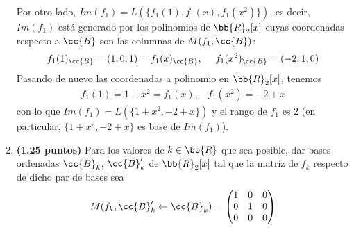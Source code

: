 \documentclass[12pt]{article}
\begin{document}
\begin{ejercicio}[2.5 puntos]
\begin{enumerate}
            Por otro lado, $Im(f_1) = L(\{f_1(1), f_1(x), f_1(x^2)\})$, es decir, $Im(f_1)$ está generado por los polinomios de $\bb{R}_2[x]$ cuyas coordenadas respecto a $\cc{B}$ son las columnas de $M(f_1, \cc{B})$:
            \begin{gather} \label{eq_2}
                f_1(1)_{\cc{B}} = (1,0,1) = f_1(x)_{\cc{B}}, \ \ \ \  f_1(x^2)_{\cc{B}} = (-2,1,0)
            \end{gather}
            Pasando de nuevo las coordenadas a polinomio en $\bb{R}_2[x]$, tenemos
            \begin{gather} \label{eq_3}
                f_1(1) = 1+x^2 = f_1(x), \ \ \ \  f_1(x^2) = -2+x
            \end{gather} 
            con lo que $Im(f_1) = L(\{1+x^2, -2+x\})$ y el rango de $f_1$ es $2$ (en particular, $\{1+x^2, -2+x\}$ es base de $Im(f_1)$).

            \item \textbf{(1.25 puntos)} Para los valores de $k \in \bb{R}$ que sea posible, dar bases ordenadas $\cc{B}_k$, $\cc{B}_k'$ de $\bb{R}_2[x]$ tal que la matriz de $f_k$ respecto de dicho par de bases sea
            \begin{gather*}
                M(f_k, \cc{B}_k' \leftarrow \cc{B}_k ) = 
                \begin{pmatrix}
                    1 & 0 & 0 \\
                    0 & 1 & 0 \\
                    0 & 0 & 0 \\
                \end{pmatrix}
            \end{gather*}
            

\end{enumerate}
\end{ejercicio}
\end{document}
